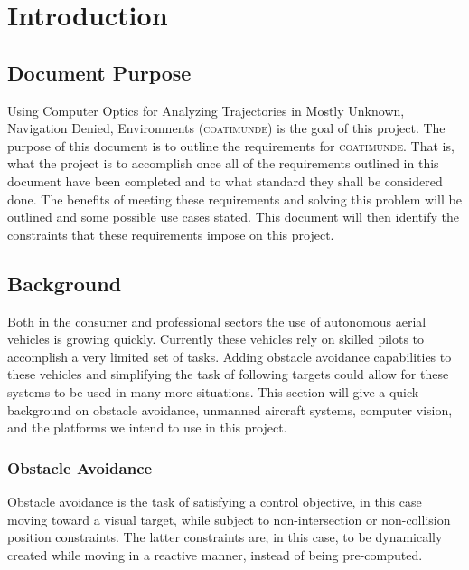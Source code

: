 \documentclass{article}
\begin{document}

\tableofcontents
\newpage

\section{Introduction}

	\subsection{Document Purpose}
	
	Using Computer Optics for Analyzing Trajectories in Mostly Unknown, Navigation Denied, Environments (\textsc{coatimunde}) is the goal of this project. The purpose of this document is to outline the requirements for \textsc{coatimunde}. That is, what the project is to accomplish once all of the requirements outlined in this document have been completed and to what standard they shall be considered done. The benefits of meeting these requirements and solving this problem will be outlined and some possible use cases stated. This document will then identify the constraints that these requirements impose on this project.
	
	\subsection{Background}
	
	Both in the consumer and professional sectors the use of autonomous aerial vehicles is growing quickly. Currently these vehicles rely on skilled pilots to accomplish a very limited set of tasks. Adding obstacle avoidance capabilities to these vehicles and simplifying the task of following targets could allow for these systems to be used in many more situations. This section will give a quick background on obstacle avoidance, unmanned aircraft systems, computer vision, and the platforms we intend to use in this project.
	
		\subsubsection{Obstacle Avoidance}
		
		
		Obstacle avoidance is the task of satisfying a control objective, in this case moving toward a visual target, while subject to non-intersection or non-collision position constraints. The latter constraints are, in this case, to be dynamically created while moving in a reactive manner, instead of being pre-computed.
		
\end{document}
